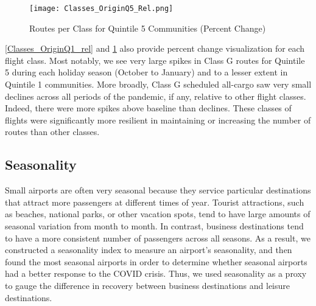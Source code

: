 \documentclass[11pt]{article}
\begin{document}
\begin{figure}[htbp]
\centerline{\texttt{[image: Classes\_OriginQ5\_Rel.png]}}
\caption{Routes per Class for Quintile 5 Communities (Percent Change)}
\label{Classes_OriginQ5_rel}
\end{figure}

\-\hspace{0.5cm} \cref{Classes_OriginQ1_rel} and \cref{Classes_OriginQ5_rel} also provide percent change visualization for each flight class. Most notably, we see very large spikes in Class G routes for Quintile 5 during each holiday season (October to January) and to a lesser extent in Quintile 1 communities. More broadly, Class G scheduled all-cargo saw very small declines across all periods of the pandemic, if any, relative to other flight classes. Indeed, there were more spikes above baseline than declines. These classes of flights were significantly more resilient in maintaining or increasing the number of routes than other classes.

\subsection{Seasonality}
Small airports are often very seasonal because they service particular destinations that attract more passengers at different times of year. Tourist attractions, such as beaches, national parks, or other vacation spots, tend to have large amounts of seasonal variation from month to month. In contrast, business destinations tend to have a more consistent number of passengers across all seasons. As a result, we constructed a seasonality index to measure an airport’s seasonality, and then found the most seasonal airports in order to determine whether seasonal airports had a better response to the COVID crisis. Thus, we used seasonality as a proxy to gauge the difference in recovery between business destinations and leisure destinations.
\end{document}
